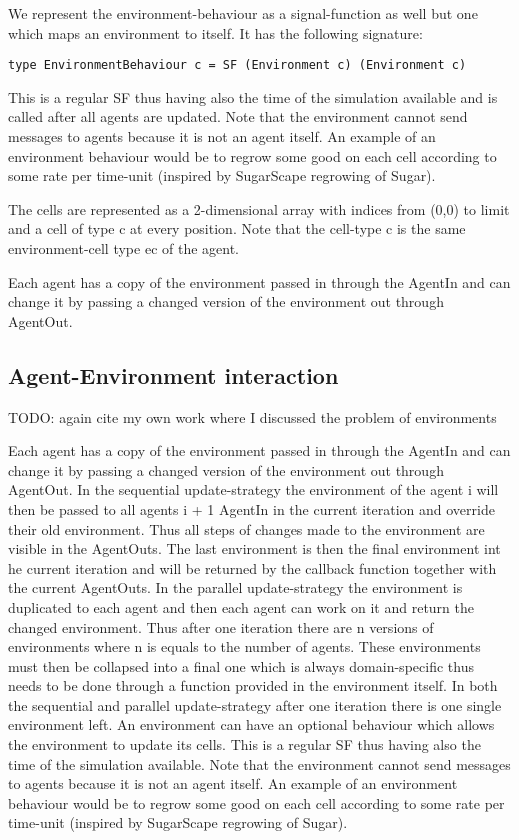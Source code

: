 We represent the environment-behaviour as a signal-function as well but one which maps an environment to itself. It has the following signature:
\begin{verbatim}
type EnvironmentBehaviour c = SF (Environment c) (Environment c)
\end{verbatim}

This is a regular SF thus having also the time of the simulation available and is called after all agents are updated. Note that the environment cannot send messages to agents because it is not an agent itself. An example of an environment behaviour would be to regrow some good on each cell according to some rate per time-unit (inspired by SugarScape regrowing of Sugar).

The cells are represented as a 2-dimensional array with indices from (0,0) to limit and a cell of type c at every position. Note that the cell-type c is the same environment-cell type ec of the agent.

Each agent has a copy of the environment passed in through the AgentIn and can change it by passing a changed version of the environment out through AgentOut.

\subsection{Agent-Environment interaction}
TODO: again cite my own work where I discussed the problem of environments

Each agent has a copy of the environment passed in through the AgentIn and can change it by passing a changed version of the environment out through AgentOut. 
In the sequential update-strategy the environment of the agent i will then be passed to all agents i + 1 AgentIn in the current iteration and override their old environment. Thus all steps of changes made to the environment are visible in the AgentOuts. The last environment is then the final environment int he current iteration and will be returned by the callback function together with the current AgentOuts.
In the parallel update-strategy the environment is duplicated to each agent and then each agent can work on it and return the changed environment. Thus after one iteration there are n versions of environments where n is equals to the number of agents. These environments must then be collapsed into a final one which is always domain-specific thus needs to be done through a function provided in the environment itself.
In both the sequential and parallel update-strategy after one iteration there is one single environment left. An environment can have an optional behaviour which allows the environment to update its cells. This is a regular SF thus having also the time of the simulation available. Note that the environment cannot send messages to agents because it is not an agent itself. An example of an environment behaviour would be to regrow some good on each cell according to some rate per time-unit (inspired by SugarScape regrowing of Sugar).


